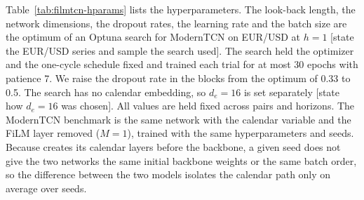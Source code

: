 Table~\ref{tab:filmtcn-hparams} lists the hyperparameters. The look-back
length, the network dimensions, the dropout rates, the learning rate and the
batch size are the optimum of an Optuna search \citep{akiba2019optuna} for
ModernTCN on EUR/USD at $h=1$ [state the EUR/USD series and sample the search
used]. The search held the optimizer and the one-cycle schedule fixed and
trained each trial for at most 30 epochs with patience 7. We raise the dropout
rate in the blocks from the optimum of 0.33 to 0.5. The search has no calendar
embedding, so $d_e=16$ is set separately [state how $d_e=16$ was chosen].
All values are held fixed across pairs and horizons. The ModernTCN benchmark
is the same network with the calendar variable and the FiLM layer removed
($M=1$), trained with the same hyperparameters and seeds. Because \FiLMTCN{}
creates its calendar layers before the backbone, a given seed does not give the
two networks the same initial backbone weights or the same batch order, so the
difference between the two models isolates the calendar path only on average
over seeds.

